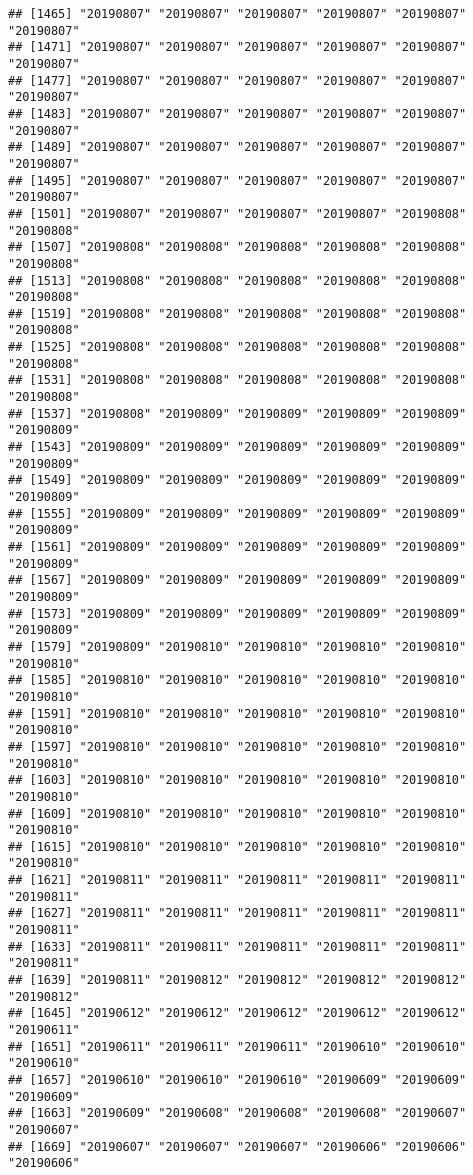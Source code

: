 \documentclass[]{article}
\begin{document}
\begin{verbatim}
## [1465] "20190807" "20190807" "20190807" "20190807" "20190807" "20190807"
## [1471] "20190807" "20190807" "20190807" "20190807" "20190807" "20190807"
## [1477] "20190807" "20190807" "20190807" "20190807" "20190807" "20190807"
## [1483] "20190807" "20190807" "20190807" "20190807" "20190807" "20190807"
## [1489] "20190807" "20190807" "20190807" "20190807" "20190807" "20190807"
## [1495] "20190807" "20190807" "20190807" "20190807" "20190807" "20190807"
## [1501] "20190807" "20190807" "20190807" "20190807" "20190808" "20190808"
## [1507] "20190808" "20190808" "20190808" "20190808" "20190808" "20190808"
## [1513] "20190808" "20190808" "20190808" "20190808" "20190808" "20190808"
## [1519] "20190808" "20190808" "20190808" "20190808" "20190808" "20190808"
## [1525] "20190808" "20190808" "20190808" "20190808" "20190808" "20190808"
## [1531] "20190808" "20190808" "20190808" "20190808" "20190808" "20190808"
## [1537] "20190808" "20190809" "20190809" "20190809" "20190809" "20190809"
## [1543] "20190809" "20190809" "20190809" "20190809" "20190809" "20190809"
## [1549] "20190809" "20190809" "20190809" "20190809" "20190809" "20190809"
## [1555] "20190809" "20190809" "20190809" "20190809" "20190809" "20190809"
## [1561] "20190809" "20190809" "20190809" "20190809" "20190809" "20190809"
## [1567] "20190809" "20190809" "20190809" "20190809" "20190809" "20190809"
## [1573] "20190809" "20190809" "20190809" "20190809" "20190809" "20190809"
## [1579] "20190809" "20190810" "20190810" "20190810" "20190810" "20190810"
## [1585] "20190810" "20190810" "20190810" "20190810" "20190810" "20190810"
## [1591] "20190810" "20190810" "20190810" "20190810" "20190810" "20190810"
## [1597] "20190810" "20190810" "20190810" "20190810" "20190810" "20190810"
## [1603] "20190810" "20190810" "20190810" "20190810" "20190810" "20190810"
## [1609] "20190810" "20190810" "20190810" "20190810" "20190810" "20190810"
## [1615] "20190810" "20190810" "20190810" "20190810" "20190810" "20190810"
## [1621] "20190811" "20190811" "20190811" "20190811" "20190811" "20190811"
## [1627] "20190811" "20190811" "20190811" "20190811" "20190811" "20190811"
## [1633] "20190811" "20190811" "20190811" "20190811" "20190811" "20190811"
## [1639] "20190811" "20190812" "20190812" "20190812" "20190812" "20190812"
## [1645] "20190612" "20190612" "20190612" "20190612" "20190612" "20190611"
## [1651] "20190611" "20190611" "20190611" "20190610" "20190610" "20190610"
## [1657] "20190610" "20190610" "20190610" "20190609" "20190609" "20190609"
## [1663] "20190609" "20190608" "20190608" "20190608" "20190607" "20190607"
## [1669] "20190607" "20190607" "20190607" "20190606" "20190606" "20190606"

\end{verbatim}
\end{document}
